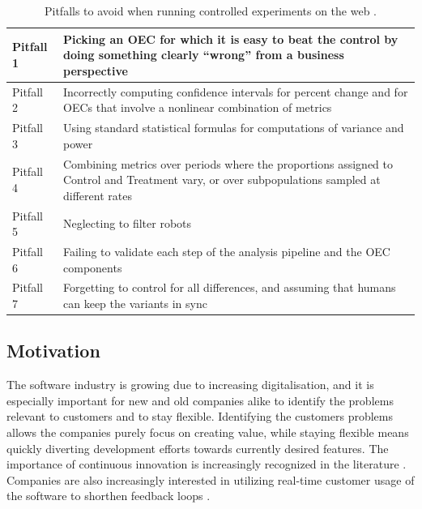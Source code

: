 \documentclass[english]{tktltiki2}
\theoremstyle{definition}
\theoremstyle{remark}
\begin{document}
\begin{center}
\begin{table}[htb]
    \begin{tabular}{ | p{2cm} | p{10cm} |}
    \hline
	Pitfall 1 & Picking an OEC for which it is easy to beat the control by doing something clearly “wrong” from a business perspective \\ \hline
	Pitfall 2 & Incorrectly computing confidence intervals for percent change and for OECs that involve a nonlinear combination of metrics \\ \hline
	Pitfall 3 & Using standard statistical formulas for computations of variance and power \\ \hline
	Pitfall 4 & Combining metrics over periods where the proportions assigned to Control and Treatment vary, or over subpopulations sampled at different rates \\ \hline
	Pitfall 5 & Neglecting to filter robots \\ \hline
	Pitfall 6 & Failing to validate each step of the analysis pipeline and the OEC components \\ \hline
	Pitfall 7 & Forgetting to control for all differences, and assuming that humans can keep the variants in sync \\ \hline
    \end{tabular}
    \caption{Pitfalls to avoid when running controlled experiments on the web \cite{crook2009seven}.}
    \end{table}
\end{center}

\subsection{Motivation}

The software industry is growing due to increasing digitalisation, and it is especially important for new and old companies alike to identify the problems relevant to customers and to stay flexible. Identifying the customers problems allows the companies purely focus on creating value, while staying flexible means quickly diverting development efforts towards currently desired features. The importance of continuous innovation is increasingly recognized in the literature \cite{steiber2013corporate}. Companies are also increasingly interested in utilizing real-time customer usage of the software to shorthen feedback loops \cite{olsson2012climbing}. 
\end{document}

